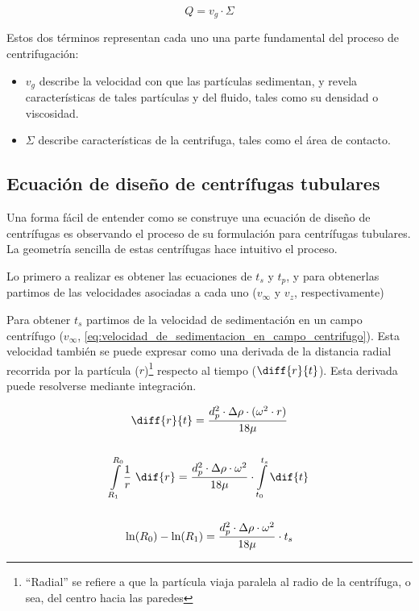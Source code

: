 \documentclass{AsignaturaResumen}
\begin{document}
\begin{equation}\label{eq:diseño_de_centrifugas_general}
    Q = v_{g} \cdot \Sigma
\end{equation}

Estos dos términos representan cada uno una parte fundamental del proceso de centrifugación:

\begin{itemize}
    \item $v_{g}$ describe la velocidad con que las partículas sedimentan, y revela características de tales partículas y del fluido, tales como su densidad o viscosidad.
    \item $\Sigma$ describe características de la centrifuga, tales como el área de contacto.
\end{itemize}



\subsection{Ecuación de diseño de centrífugas tubulares}

Una forma fácil de entender como se construye una ecuación de diseño de centrífugas es observando el proceso de su formulación para centrífugas tubulares. La geometría sencilla de estas centrífugas hace intuitivo el proceso.  

Lo primero a realizar es obtener las ecuaciones de $t_{s}$ y $t_{p}$, y para obtenerlas partimos de las velocidades asociadas a cada uno ($v_{\infty}$ y $v_{z}$, respectivamente) 

Para obtener $t_{s}$ partimos de la velocidad de sedimentación en un campo centrífugo ($v_{\infty}$, \autoref{eq:velocidad_de_sedimentacion_en_campo_centrifugo}). Esta velocidad también se puede expresar como una derivada de la distancia radial recorrida por la partícula ($r$)\footnote{``Radial'' se refiere a que la partícula viaja paralela al radio de la centrífuga, o sea, del centro hacia las paredes} respecto al tiempo ($\diff{r}{t}$). Esta derivada puede resolverse mediante integración. 

\begin{gather*}
    \diff{r}{t} = \frac{d_{p}^{2}\cdot\Delta\rho\cdot(\omega^{2}\cdot r)}{18\mu}
    \\\\
    \int\limits_{R_{1}}^{R_{0}}{\frac{1}{r} \ \dif{r}} = \frac{d_{p}^{2}\cdot\Delta\rho\cdot\omega^{2}}{18\mu} \cdot \int\limits_{t_{0}}^{t_{s}}{\dif{t}}
    \\\\
    \ln(R_{0}) - \ln(R_{1}) = \frac{d_{p}^{2}\cdot\Delta\rho\cdot\omega^{2}}{18\mu} \cdot t_{s}
\end{gather*}
\end{document}
